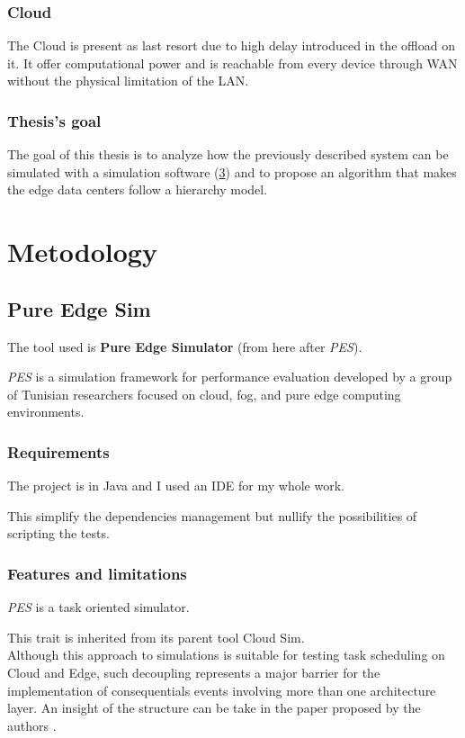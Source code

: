 \documentclass[12pt]{report}
\begin{document}
\section{Cloud}
The Cloud is present as last resort due to high delay introduced in the offload on it.
It offer computational power and is reachable from every device through WAN without the physical limitation of the LAN.


\section{Thesis's goal}
The goal of this thesis is to analyze how the previously described system can be simulated with a simulation software (\ref{PES}) and to propose an algorithm that makes the edge data centers follow a hierarchy model.

\part*{Metodology}
\chapter{Pure Edge Sim}
\label{PES}
The tool used is \textbf{Pure Edge Simulator} (from here after \textit{PES}).

\textit{PES} is a simulation framework for performance evaluation developed by a group of Tunisian researchers focused on cloud, fog, and pure edge computing environments.

\section{Requirements}
The project is in Java and I used an IDE for my whole work.

This simplify the dependencies management but nullify the possibilities of scripting the tests.

\section{Features and limitations}
\textit{PES} is a task oriented simulator.

This trait is inherited from its parent tool Cloud Sim.\\
Although this approach to simulations is suitable for testing task scheduling on Cloud and Edge, such decoupling represents a major barrier for the implementation of consequentials events involving more than one architecture layer.
An insight of the structure can be take in the paper proposed by the authors \cite{MechalikhTM21}.
\end{document}
